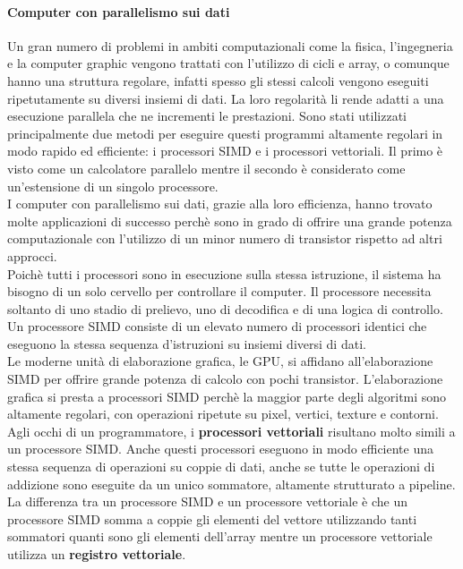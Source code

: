 \documentclass[12pt]{report}
\begin{document}
\paragraph{Computer con parallelismo sui dati} Un gran numero di problemi in ambiti computazionali come la fisica, l'ingegneria e la computer graphic vengono trattati con l'utilizzo di cicli e array, o comunque hanno una struttura regolare, infatti spesso gli stessi calcoli vengono eseguiti ripetutamente su diversi insiemi di dati. La loro regolarità li rende adatti a una esecuzione parallela che ne incrementi le prestazioni. Sono stati utilizzati principalmente due metodi per eseguire questi programmi altamente regolari in modo rapido ed efficiente: i processori SIMD e i processori vettoriali. Il primo è visto come un calcolatore parallelo mentre il secondo è considerato come un'estensione di un singolo processore. \\
I computer con parallelismo sui dati, grazie alla loro efficienza, hanno trovato molte applicazioni di successo perchè sono in grado di offrire una grande potenza computazionale con l'utilizzo di un minor numero di transistor rispetto ad altri approcci. \\
Poichè tutti i processori sono in esecuzione sulla stessa istruzione, il sistema ha bisogno di un solo cervello per controllare il computer. Il processore necessita soltanto di uno stadio di prelievo, uno di decodifica e di una logica di controllo. \\
Un processore SIMD consiste di un elevato numero di processori identici che eseguono la stessa sequenza d'istruzioni su insiemi diversi di dati. \\
Le moderne unità di elaborazione grafica, le GPU, si affidano all'elaborazione SIMD per offrire grande potenza di calcolo con pochi transistor. L'elaborazione grafica si presta a processori SIMD perchè la maggior parte degli algoritmi sono altamente regolari, con operazioni ripetute su pixel, vertici, texture e contorni. \\
Agli occhi di un programmatore, i \textbf{processori vettoriali} risultano molto simili a un processore SIMD. Anche questi processori eseguono in modo efficiente una stessa sequenza di operazioni su coppie di dati, anche se tutte le operazioni di addizione sono eseguite da un unico sommatore, altamente strutturato a pipeline. \\
La differenza tra un processore SIMD e un processore vettoriale è che un processore SIMD somma a coppie gli elementi del vettore utilizzando tanti sommatori quanti sono gli elementi dell'array mentre un processore vettoriale utilizza un \textbf{registro vettoriale}.
\end{document}
